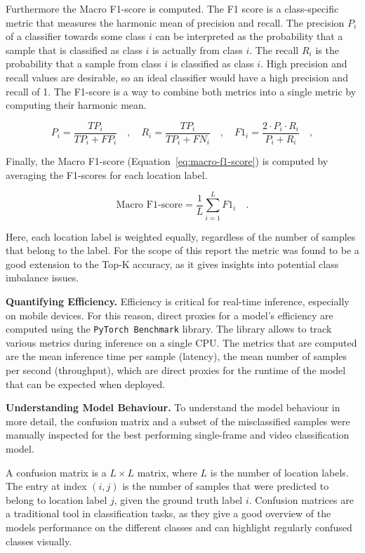 \documentclass[a4paper]{article}
\begin{document}
Furthermore the Macro F1-score is computed. The F1 score is a class-specific
metric that measures the harmonic mean of precision and recall. The precision
$P_i$ of a classifier towards some class $i$ can be interpreted as the
probability that a sample that is classified as class $i$ is actually from class
$i$. The recall $R_i$ is the probability that a sample from class $i$ is
classified as class $i$. High precision and recall values are desirable, so an
ideal classifier would have a high precision and recall of 1. The F1-score is a
way to combine both metrics into a single metric by computing their harmonic
mean.

\begin{equation}
  P_i = \frac{TP_i}{TP_i + FP_i} \quad , \quad R_i = \frac{TP_i}{TP_i + FN_i}
  \quad , \quad F1_i = \frac{2 \cdot P_i \cdot R_i}{P_i + R_i} \quad ,
  \label{eq:f1-score}
\end{equation}

Finally, the Macro F1-score (Equation~\ref{eq:macro-f1-score}) is computed by
averaging the F1-scores for each location label.

\begin{equation}
  \text{Macro F1-score} = \frac{1}{L} \sum_{i=1}^{L} F1_i \quad .
  \label{eq:macro-f1-score}
\end{equation}

Here, each location label is weighted equally, regardless of the number of
samples that belong to the label. For the scope of this report the metric was
found to be a good extension to the Top-K accuracy, as it gives insights into
potential class imbalance issues.

\textbf{Quantifying Efficiency.} Efficiency is critical for real-time inference,
especially on mobile devices. For this reason, direct proxies for a model's
efficiency are computed using the \texttt{PyTorch Benchmark} library. The
library allows to track various metrics during inference on a single CPU. The
metrics that are computed are the mean inference time per sample (latency), the
mean number of samples per second (throughput), which are direct proxies for the
runtime of the model that can be expected when deployed.

\textbf{Understanding Model Behaviour.}  To understand the model behaviour in
more detail, the confusion matrix and a subset of the misclassified samples were
manually inspected for the best performing single-frame and video classification
model. 

A confusion matrix is a $L \times L$ matrix, where $L$ is the number of
location labels. The entry at index $(i,j)$ is the number of samples that were
predicted to belong to location label $j$, given the ground truth label $i$.
Confusion matrices are a traditional tool in classification tasks, as they give
a good overview of the models performance on the different classes and can
highlight regularly confused classes visually.
\end{document}
